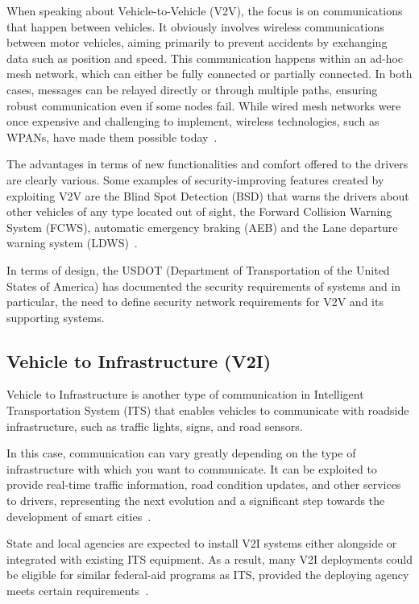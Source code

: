 When speaking about Vehicle-to-Vehicle (V2V), the focus is on communications that happen between vehicles.
It obviously involves wireless communications between motor vehicles,
aiming primarily to prevent accidents by exchanging data such as position and speed.
This communication happens within an ad-hoc mesh network, which can either be fully connected or partially connected.
In both cases, messages can be relayed directly or through multiple paths,
ensuring robust communication even if some nodes fail.
While wired mesh networks were once expensive and challenging to implement,
wireless technologies, such as WPANs, have made them possible today~\cite{arena2019overview}.

The advantages in terms of new functionalities and comfort offered to the drivers are clearly various.
Some examples of security-improving features created by exploiting V2V are the Blind Spot Detection (BSD) that warns the drivers about other vehicles of any type located out of sight,
the Forward Collision Warning System (FCWS), automatic emergency braking (AEB) and the Lane departure warning system (LDWS)~\cite{arena2019overview}.

In terms of design,
the USDOT (Department of Transportation of the United States of America) has documented the security requirements of
systems and in particular, the need to define security network requirements for V2V and its supporting systems.

\subsection{Vehicle to Infrastructure (V2I)}\label{subsec:vehicle-to-infrastructure-(v2i)}
Vehicle to Infrastructure is another type of communication in Intelligent Transportation System (ITS)
that enables vehicles to communicate with roadside infrastructure, such as traffic lights, signs, and road sensors.

In this case, communication can vary greatly depending on the type of infrastructure with which you want to communicate.
It can be exploited to provide real-time traffic information, road condition updates, and other services to drivers,
representing the next evolution and a significant step towards the development of smart cities~\cite{dot2024v2i}.

State and local agencies are expected to install V2I systems either alongside or integrated with existing ITS equipment.
As a result, many V2I deployments could be eligible for similar federal-aid programs as ITS,
provided the deploying agency meets certain requirements~\cite{dot2024v2i}.

